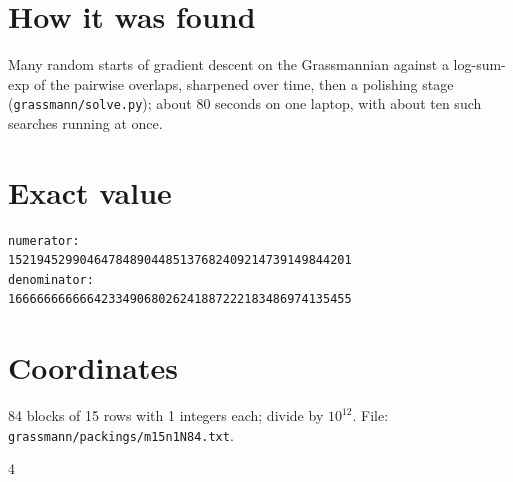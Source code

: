 \documentclass[11pt,a4paper]{article}
\begin{document}
\section{How it was found}
Many random starts of gradient descent on the Grassmannian against a log-sum-exp of the pairwise overlaps, sharpened over time, then a polishing stage (\texttt{grassmann/solve.py}); about 80 seconds on one laptop, with about ten such searches running at once.


\appendix
\section{Exact value}
{\small
\begin{verbatim}
numerator:
152194529904647848904485137682409214739149844201
denominator:
166666666666423349068026241887222183486974135455
\end{verbatim}}

\section{Coordinates}
84 blocks of 15 rows with 1 integers each; divide by $10^{12}$. File: \texttt{grassmann/packings/m15n1N84.txt}.
{\tiny
\begin{multicols}{4}
\end{multicols}}
\end{document}

